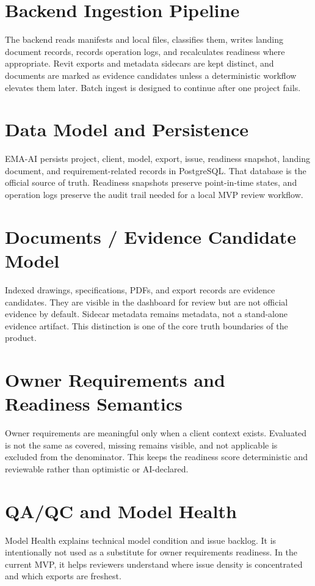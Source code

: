 \documentclass[11pt]{article}
\begin{document}
\section{Backend Ingestion Pipeline}
The backend reads manifests and local files, classifies them, writes landing document records, records operation logs, and recalculates readiness where appropriate. Revit exports and metadata sidecars are kept distinct, and documents are marked as evidence candidates unless a deterministic workflow elevates them later. Batch ingest is designed to continue after one project fails.

\section{Data Model and Persistence}
EMA-AI persists project, client, model, export, issue, readiness snapshot, landing document, and requirement-related records in PostgreSQL. That database is the official source of truth. Readiness snapshots preserve point-in-time states, and operation logs preserve the audit trail needed for a local MVP review workflow.

\section{Documents / Evidence Candidate Model}
Indexed drawings, specifications, PDFs, and export records are evidence candidates. They are visible in the dashboard for review but are not official evidence by default. Sidecar metadata remains metadata, not a stand-alone evidence artifact. This distinction is one of the core truth boundaries of the product.

\section{Owner Requirements and Readiness Semantics}
Owner requirements are meaningful only when a client context exists. Evaluated is not the same as covered, missing remains visible, and not applicable is excluded from the denominator. This keeps the readiness score deterministic and reviewable rather than optimistic or AI-declared.

\section{QA/QC and Model Health}
Model Health explains technical model condition and issue backlog. It is intentionally not used as a substitute for owner requirements readiness. In the current MVP, it helps reviewers understand where issue density is concentrated and which exports are freshest.
\end{document}
